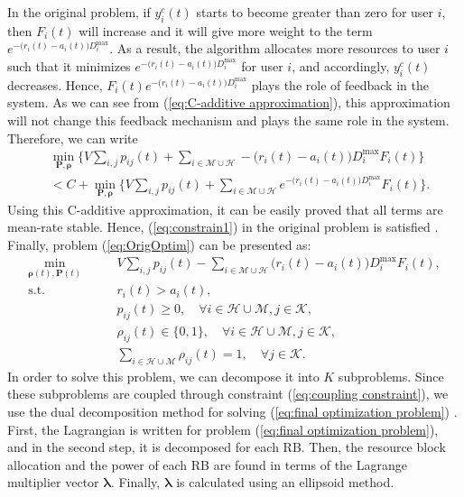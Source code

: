 \documentclass[journal,draftclsnofoot,onecolumn,12pt]{IEEEtran}%
\newcommand{\rhob}{\boldsymbol{\rho}}
\newcommand{\Pb}{\boldsymbol{P}}
\newcommand{\lambdab}{\boldsymbol{\lambda}}
\begin{document}
In the original problem, if {$y^c_i(t)$} starts to become greater than zero for user $i$, then $F_i(t)$ will increase and it will give more weight to the term $e^{-\big(r_i(t)-a_i(t)\big)D_i^{\max}}$. As a result, the algorithm allocates more resources to user $i$ such that it minimizes $e^{-\big(r_i(t)-a_i(t)\big)D_i^{\max}}$ for user $i$, and accordingly, {$y^c_i(t)$} decreases. Hence, $F_i(t) e^{-\big(r_i(t)-a_i(t)\big)D_i^{\max}}$ plays the role of feedback in the system. 
As we can see from (\ref{eq:C-additive approximation}), this approximation will not change this feedback mechanism and plays the same role in the system.
Therefore, we can write
{
\begin{align}
&\underset{\boldsymbol{P}, \mathbf{\rho}}{\min}\big\{V\sum_{i,j}p_{ij}(t)+\sum_{i\in \mathcal{M} \cup \mathcal{H}} -\big(r_i(t)-a_i(t)\big)D_i^{\max}F_i(t) \big\}\nonumber\\
&<C+\underset{\boldsymbol{P}, \mathbf{\rho}}{\min}\big\{V\sum_{i,j}p_{ij}(t)+\sum_{i\in \mathcal{M} \cup \mathcal{H}}e^{-\big(r_i(t)-a_i(t)\big)D_i^{\max}}F_i(t)\big\}.
\end{align}}
Using this C-additive approximation, it can be easily proved that all terms are mean-rate stable. Hence, (\ref{eq:constrain1}) in the original problem is satisfied \cite{neely2010stochastic}. 
Finally, problem (\ref{eq:OrigOptim}) can be presented as:
{
\begin{subequations}\label{eq:final optimization problem}
	\begin{align}
	\min_{\rhob(t),\Pb(t)} \qquad &V\sum_{i,j}p_{ij}(t)-\sum_{i\in \mathcal{M} \cup \mathcal{H}} \big(r_i(t)-a_i(t)\big)D_i^{\max}F_i(t), \nonumber\\
	\text{s.t.} \qquad &r_i(t)>a_i(t), \label{eq:minimum rate lambda}\\
	&p_{ij}(t) \geq 0, \quad \forall i \in \mathcal{H} \cup \mathcal{M}, j\in \mathcal{K},\\
	&\rho_{ij}(t) \in \{0,1\}, \quad  \forall i \in \mathcal{H} \cup \mathcal{M}, j\in \mathcal{K}, \\
    &\sum_{i \in \mathcal{H} \cup \mathcal{M}}\rho_{ij}(t)=1, \quad\forall j\in \mathcal{K}.\label{eq:coupling constraint}
	\end{align}
\end{subequations}
}
In order to solve this problem, we can decompose it into $K$ subproblems. Since these subproblems are coupled through constraint (\ref{eq:coupling constraint}),  we use the dual decomposition method for solving (\ref{eq:final optimization problem}) \cite{seong2006optimal}.  First, the Lagrangian is written for problem (\ref{eq:final optimization problem}), and in the second step, it is decomposed for each RB. Then, the resource block allocation and the power of each RB are found in terms of the Lagrange multiplier {vector} $\lambdab$. Finally, $\lambdab$ is calculated using an ellipsoid method.
\end{document}
